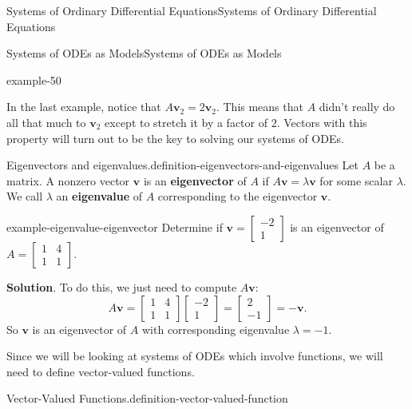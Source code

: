 \documentclass[10pt,]{book}
\newcommand{\terminology}[1]{\textbf{#1}}
\numberwithin{equation}{section}
\renewcommand{\vec}[1]{\mathbf{#1}}
\newcommand{\amp}{&}
\begin{document}
\begin{chapterptx}{Systems of Ordinary Differential Equations}{}{Systems of Ordinary Differential Equations}{}{}
\begin{sectionptx}{Systems of ODEs as Models}{}{Systems of ODEs as Models}{}{}
\begin{example}{}{example-50}
\begin{equation*}
\end{equation*}
%
\end{example}
\hypertarget{p-310}{}%
In the last example, notice that \(A\vec{v}_{2} = 2\vec{v}_{2}\). This means that \(A\) didn't really do all that much to \(\vec{v}_{2}\) except to stretch it by a factor of \(2\). Vectors with this property will turn out to be the key to solving our systems of ODEs.%
\begin{definition}{Eigenvectors and eigenvalues.}{definition-eigenvectors-and-eigenvalues}%
\hypertarget{p-311}{}%
Let \(A\) be a matrix. A nonzero vector \(\vec{v}\) is an \terminology{eigenvector} of \(A\) if \(A\vec{v} = \lambda\vec{v}\) for some scalar \(\lambda\). We call \(\lambda\) an \terminology{eigenvalue} of \(A\) corresponding to the eigenvector \(\vec{v}\).%
\end{definition}
\begin{example}{}{example-eigenvalue-eigenvector}%
\hypertarget{p-312}{}%
Determine if \(\vec{v} = \begin{bmatrix}-2\\1\end{bmatrix}\) is an eigenvector of \(A = \begin{bmatrix}1\amp4\\1\amp1\end{bmatrix}\).%
\par\smallskip%
\noindent\textbf{Solution}.\hypertarget{solution-48}{}\quad%
\hypertarget{p-313}{}%
To do this, we just need to compute \(A\vec{v}:\)%
\begin{equation*}
A\vec{v} = \begin{bmatrix}1\amp4\\1\amp1\end{bmatrix}\begin{bmatrix}-2\\1\end{bmatrix} = \begin{bmatrix}2\\-1\end{bmatrix} = -\vec{v}.
\end{equation*}
So \(\vec{v}\) is an eigenvector of \(A\) with corresponding eigenvalue \(\lambda=-1\).%
\end{example}
\hypertarget{p-314}{}%
Since we will be looking at systems of ODEs which involve functions, we will need to define vector-valued functions.%
\begin{definition}{Vector-Valued Functions.}{definition-vector-valued-function}%
\hypertarget{p-315}{}%

\end{definition}
\end{sectionptx}
\end{chapterptx}
\end{document}
